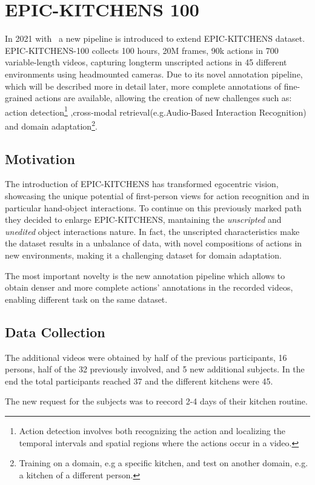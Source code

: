 \section{EPIC-KITCHENS 100}\label{sec:EK100}
In 2021 with~\cite{EK100} a new pipeline is introduced to extend EPIC-KITCHENS dataset.
EPIC-KITCHENS-100 collects 100 hours, 20M frames, 90k actions in 700 variable-length
videos, capturing longterm unscripted actions in 45 different environments using headmounted
cameras. Due to its novel annotation pipeline, which will be described more in detail later,
more complete annotations of fine-grained actions are available, allowing the creation of new challenges
such as: action detection\footnote{Action detection involves both recognizing the action and localizing the temporal intervals and spatial regions where the actions occur in a video.}
,cross-modal retrieval(e.g.Audio-Based Interaction Recognition) and domain adaptation\footnote{Training on a domain, e.g a specific kitchen, and test on another domain, e.g. a kitchen of a different person.}.
\subsection{Motivation}
The introduction of EPIC-KITCHENS has transformed egocentric vision, showcasing the unique potential of
first-person views for action recognition and in particular hand-object interactions. To continue
on this previously marked path they decided to enlarge EPIC-KITCHENS, mantaining the \textit{unscripted}
and \textit{unedited} object interactions nature. In fact, the unscripted characteristics make 
the dataset results in a unbalance of data, with novel compositions of actions in new environments,
making it a challenging dataset for domain adaptation.

The most important novelty is the new annotation pipeline which allows to obtain denser and more complete actions'
annotations in the recorded videos, enabling different task on the same dataset.

\subsection{Data Collection}
The additional videos were obtained by half of the previous participants, 16 persons, half of the 
32 previously involved, and 5 new additional subjects. In the end the total participants reached 37
and the different kitchens were 45. 

The new request for the subjects was to reecord 2-4 days of their kitchen routine.

